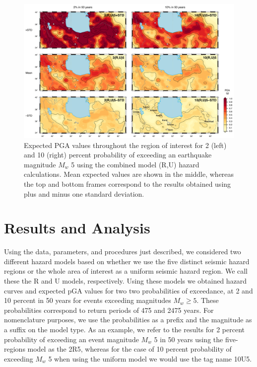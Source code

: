 \begin{figure}[t]
    \centering
    \includegraphics[width=\textwidth]{figures/pdf/figure-10.pdf} 
    \caption{Expected PGA values throughout the region of interest for 2 (left) and 10 (right) percent probability of exceeding an earthquake magnitude $M_w$ 5 using the combined model (R,U) hazard calculations. Mean expected values are shown in the middle, whereas the top and bottom frames correspond to the results obtained using plus and minus one standard deviation.}
    \label{fig:pga.ru.std}
\end{figure}



\section{Results and Analysis}

Using the data, parameters, and procedures just described, we considered two different hazard models based on whether we use the five distinct seismic hazard regions or the whole area of interest as a uniform seismic hazard region. We call these the R and U models, respectively. Using these models we obtained hazard curves and expected pGA values for two two probabilities of exceedance, at 2 and 10 percent in 50 years for events exceeding magnitudes $M_w \geq 5$. These probabilities correspond to return periods of 475 and 2475 years. For nomenclature purposes, we use the probabilities as a prefix and the magnitude as a suffix on the model type. As an example, we refer to the results for 2 percent probability of exceeding an event magnitude $M_w$ 5 in 50 years using the five-regions model as the 2R5, whereas for the case of 10 percent probability of exceeding $M_w$ 5 when using the uniform model we would use the tag name 10U5.

